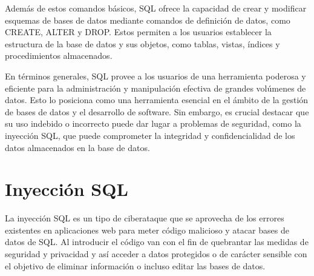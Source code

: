 \documentclass[11pt]{report}
\begin{document}
Además de estos comandos básicos, SQL ofrece la capacidad de crear y modificar
esquemas de bases de datos mediante comandos de definición de datos, como CREATE,
ALTER y DROP. Estos permiten a los usuarios establecer la estructura de la base de datos
y sus objetos, como tablas, vistas, índices y procedimientos almacenados.

En términos generales, SQL provee a los usuarios de una herramienta poderosa y eficiente
para la administración y manipulación efectiva de grandes volúmenes de datos. Esto lo
posiciona como una herramienta esencial en el ámbito de la gestión de bases de datos y el
desarrollo de software. Sin embargo, es crucial destacar que su uso indebido o incorrecto
puede dar lugar a problemas de seguridad, como la inyección SQL, que puede
comprometer la integridad y confidencialidad de los datos almacenados en la base de datos.

\section{Inyección SQL}
La inyección SQL es un tipo de ciberataque que se aprovecha de los errores existentes en
aplicaciones web para meter código malicioso y atacar bases de datos de SQL. Al introducir
el código van con el fin de quebrantar las medidas de seguridad y privacidad y así acceder a
datos protegidos o de carácter sensible con el objetivo de eliminar información o incluso
editar las bases de datos.
\end{document}

